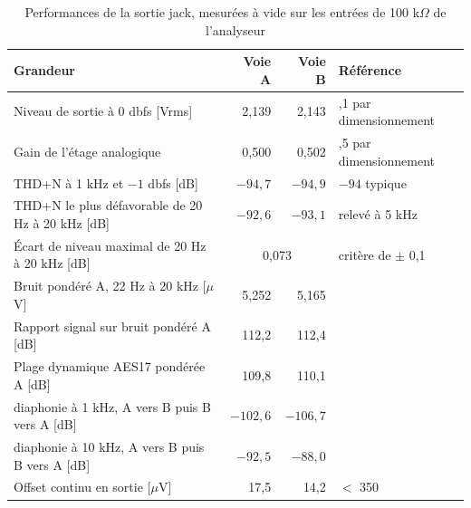 \begin{table}[H]
    \centering
    \caption{Performances de la sortie jack, mesurées à vide sur les entrées de 100 k$\Omega$ de l'analyseur}
    \label{tab:res_audio}
    \footnotesize
    \setlength{\tabcolsep}{5pt}
    \begin{tabular}{@{}>{\raggedright\arraybackslash}p{} r r >{\raggedright\arraybackslash}p{}@{}}
        \toprule
        \textbf{Grandeur}                                     & \textbf{Voie A}           & \textbf{Voie B}      & \textbf{Référence}              \\
        \midrule
        Niveau de sortie à 0 \gls{dbfs} [Vrms]                & 2,139                     & 2,143                & 2,1 par dimensionnement         \\
        Gain de l'étage analogique                            & 0,500                     & 0,502                & 0,5 par dimensionnement         \\
        THD+N à 1 kHz et $-1$ \gls{dbfs} [dB]                 & $-94,7$                   & $-94,9$              & $-94$ typique \cite{TI_PCM5242} \\
        THD+N le plus défavorable de 20 Hz à 20 kHz [dB]      & $-92,6$                   & $-93,1$              & relevé à 5 kHz                  \\
        Écart de niveau maximal de 20 Hz à 20 kHz [dB]        & \multicolumn{2}{c}{0,073} & critère de $\pm$ 0,1                                   \\
        Bruit pondéré A, 22 Hz à 20 kHz [$\mu$V]              & 5,252                     & 5,165                &                                 \\
        Rapport signal sur bruit pondéré A [dB]               & 112,2                     & 112,4                &                                 \\
        Plage dynamique AES17 pondérée A [dB]                 & 109,8                     & 110,1                &                                 \\
        \gls{diaphonie} à 1 kHz, A vers B puis B vers A [dB]  & $-102,6$                  & $-106,7$             &                                 \\
        \gls{diaphonie} à 10 kHz, A vers B puis B vers A [dB] & $-92,5$                   & $-88,0$              &                                 \\
        Offset continu en sortie [$\mu$V]                     & 17,5                      & 14,2                 & $<$ 350 \cite{analog_MAX97220A} \\
        \bottomrule
    \end{tabular}
\end{table}

